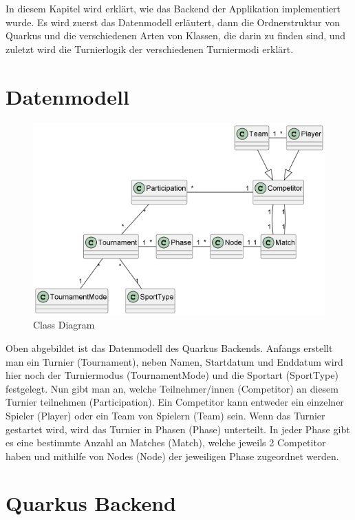 In diesem Kapitel wird erklärt, wie das Backend der Applikation implementiert wurde. Es wird zuerst das Datenmodell erläutert, dann die Ordnerstruktur von 
Quarkus und die verschiedenen Arten von Klassen, die darin zu finden sind, und zuletzt wird die Turnierlogik der verschiedenen Turniermodi erklärt.

\section{Datenmodell}

\begin{figure}[H]
    \includegraphics[scale=1]{pics/backend/class_diagram.png}
    \caption{Class Diagram}
\end{figure}

Oben abgebildet ist das Datenmodell des Quarkus Backends. Anfangs erstellt man ein Turnier (Tournament), neben Namen, Startdatum und Enddatum 
wird hier noch der Turniermodus (TournamentMode) und die Sportart (SportType) festgelegt. Nun gibt man an, welche Teilnehmer/innen (Competitor) an diesem Turnier teilnehmen (Participation). 
Ein Competitor kann entweder ein einzelner Spieler (Player) oder ein Team von Spielern (Team) sein.
Wenn das Turnier gestartet wird, wird das Turnier in Phasen (Phase) unterteilt. In jeder Phase gibt es eine bestimmte Anzahl an Matches (Match), welche jeweils 2 Competitor haben und mithilfe von Nodes (Node) 
der jeweiligen Phase zugeordnet werden.

\section{Quarkus Backend}

